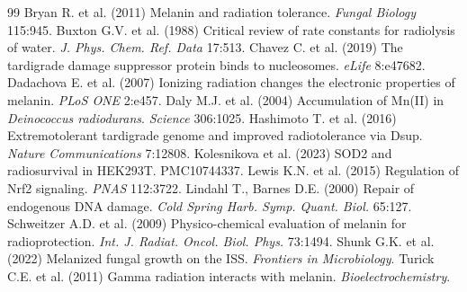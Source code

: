 \documentclass[11pt]{article}
\begin{document}
\begin{thebibliography}{99}
\small
{} Bryan R. et al. (2011) Melanin and radiation tolerance.
\textit{Fungal Biology} 115:945.
 Buxton G.V. et al. (1988) Critical review of rate constants
for radiolysis of water. \textit{J. Phys. Chem. Ref. Data} 17:513.
 Chavez C. et al. (2019) The tardigrade damage suppressor
protein binds to nucleosomes. \textit{eLife} 8:e47682.
 Dadachova E. et al. (2007) Ionizing radiation changes the
electronic properties of melanin. \textit{PLoS ONE} 2:e457.
 Daly M.J. et al. (2004) Accumulation of Mn(II) in
\textit{Deinococcus radiodurans}. \textit{Science} 306:1025.
 Hashimoto T. et al. (2016) Extremotolerant tardigrade
genome and improved radiotolerance via Dsup. \textit{Nature Communications}
7:12808.
 Kolesnikova et al. (2023) SOD2 and radiosurvival in
HEK293T. PMC10744337.
 Lewis K.N. et al. (2015) Regulation of Nrf2 signaling.
\textit{PNAS} 112:3722.
 Lindahl T., Barnes D.E. (2000) Repair of endogenous DNA
damage. \textit{Cold Spring Harb. Symp. Quant. Biol.} 65:127.
 Schweitzer A.D. et al. (2009) Physico-chemical evaluation
of melanin for radioprotection. \textit{Int. J. Radiat. Oncol. Biol. Phys.}
73:1494.
 Shunk G.K. et al. (2022) Melanized fungal growth on the ISS.
\textit{Frontiers in Microbiology}.
 Turick C.E. et al. (2011) Gamma radiation interacts with
melanin. \textit{Bioelectrochemistry}.
\end{thebibliography}
\end{document}
